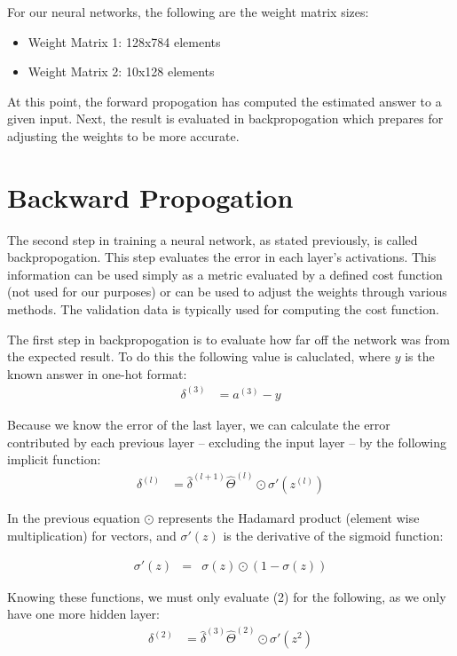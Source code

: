 \documentclass[11pt]{article}
\begin{document}
For our neural networks, the following are the weight matrix sizes:
\begin{itemize}[noitemsep,nolistsep]
	\item Weight Matrix 1: 128x784 elements
	\item Weight Matrix 2: 10x128 elements
\end{itemize}

At this point, the forward propogation has computed the estimated answer to a given input. Next, the result is evaluated in backpropogation which prepares for adjusting the weights to be more accurate.

\section{Backward Propogation}
The second step in training a neural network, as stated previously, is called backpropogation. This step evaluates the error in each layer's activations. This information can be used simply as a metric evaluated by a defined cost function (not used for our purposes) or can be used to adjust the weights through various methods. The validation data is typically used for computing the cost function.

The first step in backpropogation is to evaluate how far off the network was from the expected result. To do this the following value is caluclated, where $y$ is the known answer in one-hot format:
\begin{align*}
	\delta^{(3)} & = a^{(3)} - y
\end{align*}

Because we know the error of the last layer, we can calculate the error contributed by each previous layer -- excluding the input layer -- by the following implicit function:
\begin{align}
	\delta^{(l)} & = \widehat{\delta}^{(l+1)}\widehat{\Theta}^{(l)} \odot \sigma'(z^{(l)})
\end{align}

In the previous equation $\odot$ represents the Hadamard product (element wise multiplication) for vectors, and $\sigma'(z)$ is the derivative of the sigmoid function:

\begin{align}
	\sigma'(z) & = & \sigma(z) \odot (1 - \sigma(z))
\end{align}

Knowing these functions, we must only evaluate (2) for the following, as we only have one more hidden layer:
\begin{align*}
	\delta^{(2)} & = \widehat{\delta}^{(3)}\widehat{\Theta}^{(2)} \odot \sigma'(z^2)
\end{align*}
\end{document}
